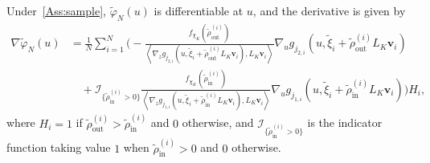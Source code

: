 \documentclass[%
onefignum,onetabnum]{siamonline250211}
\newcommand{\braket}[1]{\left\langle #1\right\rangle}
\newcommand{\cI}{\mathcal I} \newcommand{\cJ}{\mathcal J}
\begin{document}
\begin{proposition}\label{Prop:differentiability}
    Under~\cref{Ass:sample}, $\tilde{\varphi}_N(u)$ is differentiable at $u$, and the derivative is given by
    \begin{equation}\label{Eq:GradDis}
        \begin{aligned}
            \nabla \tilde{\varphi}_N(u) &= \frac{1}{N}\sum_{i=1}^N \Bigg( -\frac{f_{\chi_K}(\tilde{\rho}_{\mathrm{out}}^{(i)})}{\braket{\nabla_{z}g_{j_{2,i}}(u,\tilde{\xi}_i+\tilde{\rho}_{\mathrm{out}}^{(i)} L_K\boldsymbol{v}_i), L_K\boldsymbol{v}_i}}\nabla_u g_{j_{2,i}}(u,\tilde{\xi}_i+\tilde{\rho}_{\mathrm{out}}^{(i)} L_K\boldsymbol{v}_i) \\
            &\quad  + \cI_{\{\tilde{\rho}_{\mathrm{in}}^{(i)} > 0\}} \frac{f_{\chi_K}(\tilde{\rho}_{\mathrm{in}}^{(i)})}{\braket{\nabla_{z}g_{j_{1,i}}(u,\tilde{\xi}_i+\tilde{\rho}_{\mathrm{in}}^{(i)} L_K\boldsymbol{v}_i), L_K\boldsymbol{v}_i}}\nabla_u g_{j_{1,i}}(u,\tilde{\xi}_i+\tilde{\rho}_{\mathrm{in}}^{(i)} L_K\boldsymbol{v}_i) \Bigg) H_i,
        \end{aligned}
    \end{equation}
    where $H_i = 1$ if $\tilde{\rho}_{\mathrm{out}}^{(i)} > \tilde{\rho}_{\mathrm{in}}^{(i)}$ and $0$ otherwise, and $\cI_{\{\tilde{\rho}_{\mathrm{in}}^{(i)} > 0\}}$ is the indicator function taking value $1$ when $\tilde{\rho}_{\mathrm{in}}^{(i)} > 0$ and $0$ otherwise.
\end{proposition}
\end{document}
